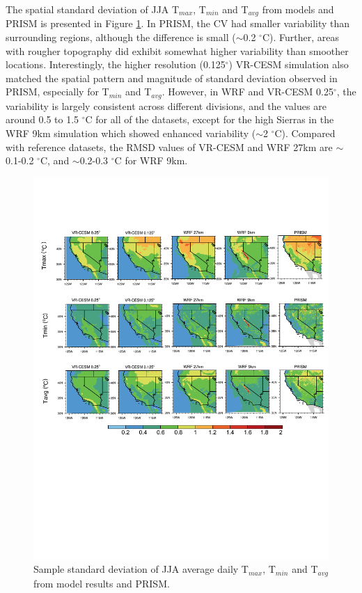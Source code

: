 The spatial standard deviation of JJA T$_{max}$, T$_{min}$ and T$_{avg}$ from models and PRISM is presented in Figure \ref{fig:Figure 5}. In PRISM, the CV had smaller variability than surrounding regions, although the difference is small ($\sim$0.2 $^\circ$C). Further, areas with rougher topography did exhibit somewhat higher variability than smoother locations. Interestingly, the higher resolution (0.125$^\circ$) VR-CESM simulation also matched the spatial pattern and magnitude of standard deviation observed in PRISM, especially for T$_{min}$ and T$_{avg}$. However, in WRF and VR-CESM 0.25$^\circ$, the variability is largely consistent across different divisions, and the values are around 0.5 to 1.5 $^\circ$C for all of the datasets, except for the high Sierras in the WRF 9km simulation which showed enhanced variability ($\sim$2 $^\circ$C). Compared with reference datasets, the RMSD values of VR-CESM and WRF 27km are $\sim$0.1-0.2 $^\circ$C, and $\sim$0.2-0.3 $^\circ$C for WRF 9km.

\begin{figure}
\begin{center}
\includegraphics[width=6in]{t2_JJA_std.pdf}
\end{center}
\caption{Sample standard deviation of JJA average daily T$_{max}$, T$_{min}$ and T$_{avg}$ from model results and PRISM.} \label{fig:Figure 5}
\end{figure}

